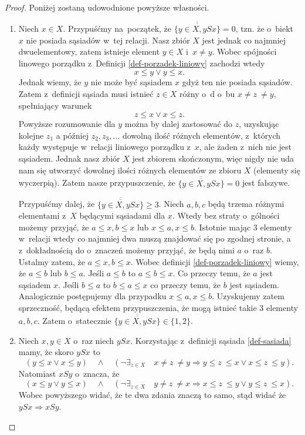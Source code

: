 \documentclass[12pt,a4paper]{report}
\newcommand{\licznosc}[1]{\overline{\overline{#1}}}
\begin{document}
\begin{proof}
Poniżej zostaną udowodnione powyższe własności.
\begin{enumerate}
\item Niech $x \in X$. Przypuśćmy na~początek, że $\licznosc{\{y \in X, ySx\}} = 0$, tzn. że o~biekt $x$ nie posiada sąsiadów w~tej relacji. Nasz zbiór $X$ jest jednak co najmniej dwuelementowy, zatem istnieje element $y \in X$ i~$ x \neq y$. Wobec spójności linowego porządku z~Definicji \ref{def-porzadek-liniowy} zachodzi wtedy
$$ x \leq y \lor y \leq x.$$
Jednak wiemy, że $y$ nie może być sąsiadem $x$ gdyż ten nie posiada sąsiadów. Zatem z~definicji sąsiada musi istnieć $z \in X$ różny o~d o~bu $x \neq z~\neq y$, spełniający warunek
$$
z \leq x \lor x \leq z.
$$
Powyższe rozumowanie dla $y$ można by dalej zastosować do $z$, uzyskując kolejne $z_1$ a później $z_2,z_3, \ldots$ dowolną ilość różnych elementów, z~których każdy występuje w~relacji liniowego porządku z~$x$, ale żaden z~nich nie jest sąsiadem. Jednak nasz zbiór $X$ jest zbiorem skończonym, więc nigdy nie uda nam się utworzyć dowolnej ilości różnych elementów ze zbioru $X$ (elementy się wyczerpią). Zatem nasze przypuszczenie, że $\licznosc{\{y \in X, ySx\}} = 0$ jest fałszywe.

Przypuśćmy dalej, że $\licznosc{\{y \in X, ySx\}} \geq 3$. Niech $a,b,c$ będą trzema różnymi elementami z~$X$ będącymi sąsiadami dla $x$. Wtedy bez straty o~gólności możemy przyjąć, że $a \leq x, b \leq x$ lub $x \leq a, x \leq b$. Istotnie mając 3 elementy w~relacji wtedy co najmniej dwa muszą znajdować się po zgodnej stronie, a z~dokładnością do o~znaczeń możemy przyjąć, że będą nimi $a$ o~raz $b$. Ustalmy zatem, że $a \leq x, b \leq x$. Wobec definicji \ref{def-porzadek-liniowy} wiemy, że $a \leq b$ lub $b \leq a$. Jeśli $a \leq b$ to $a \leq b \leq x$. Co przeczy temu, że $a$ jest sąsiadem $x$. Jeśli $b \leq a$ to $b \leq a \leq x$ co przeczy temu, że $b$ jest sąsiadem. Analogicznie postępujemy dla przypadku $x \leq a, x \leq b$. Uzyskujemy zatem sprzeczność, będącą efektem przypuszczenia, że mogą istnieć takie 3 elementy $a,b,c$. Zatem o~statecznie $\licznosc{\{y \in X, ySx\}} \in \{ 1,2 \}$.

\item Niech $x,y \in X$ o~raz niech $ySx$. Korzystając z~definicji sąsiada \ref{def-sasiada} mamy, że skoro $ySx$ to  $$\left(y \leq x \lor x\leq y \right)\quad \land \quad  \left(\lnot \exists_{z \in X}  \quad x\neq z~\neq y \Rightarrow   y \leq z~\leq x \lor x \leq z~\leq y \right).$$ 
Natomiast $xSy$ o~znacza, że 
$$\left(x \leq y \lor y\leq x \right)\quad \land \quad  \left(\lnot \exists_{z \in X}  \quad y\neq z~\neq x \Rightarrow   x \leq z~\leq y \lor y \leq z~\leq x \right).$$ 
Wobec powyższego widać, że te dwa zdania znaczą to samo, stąd widać że  $ySx \Rightarrow xSy$. %


\end{enumerate}
\end{proof}
\end{document}
